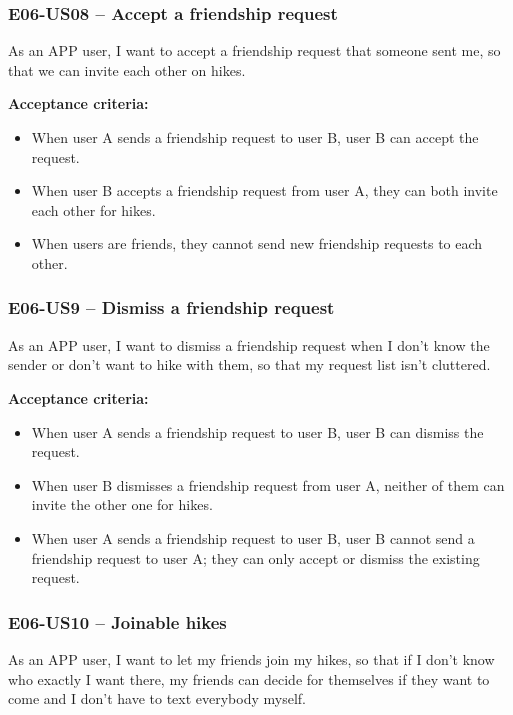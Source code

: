 \subsubsection*{E06-US08 -- Accept a friendship request}
As an APP user, I want to accept a friendship request that someone sent me, so that we can invite each other on hikes.

\textbf{Acceptance criteria:}
\begin{itemize}
    \item When user A sends a friendship request to user B, user B can accept the request.
    \item When user B accepts a friendship request from user A, they can both invite each other for hikes.
    \item When users are friends, they cannot send new friendship requests to each other.
\end{itemize}


\subsubsection*{E06-US9 -- Dismiss a friendship request}
As an APP user, I want to dismiss a friendship request when I don't know the sender or don't want to hike with them, so that my request list isn't cluttered.

\textbf{Acceptance criteria:} 
\begin{itemize}
    \item When user A sends a friendship request to user B, user B can dismiss the request.
    \item When user B dismisses a friendship request from user A, neither of them can invite the other one for hikes.
    \item When user A sends a friendship request to user B, user B cannot send a friendship request to user A; they can only accept or dismiss the existing request.
\end{itemize}



\subsubsection*{E06-US10 -- Joinable hikes}
As an APP user, I want to let my friends join my hikes, so that if I don't know who exactly I want there, my friends can decide for themselves if they want to come and I don't have to text everybody myself.

